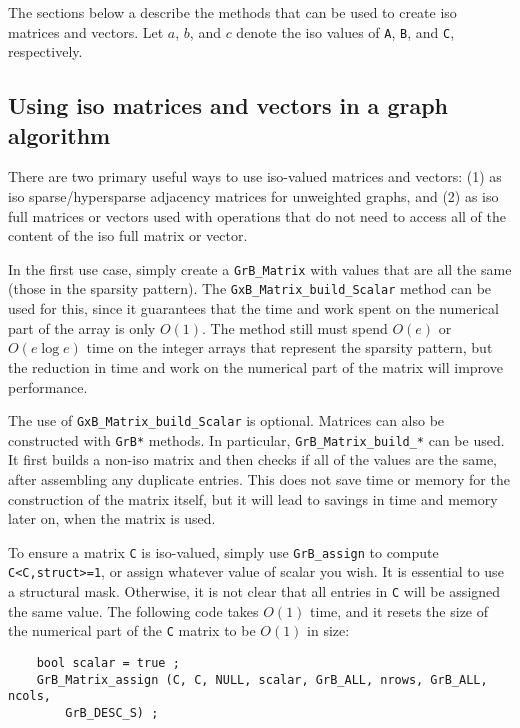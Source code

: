 \documentclass[12pt]{article}
\begin{document}
{The sections below a describe the methods that can be used to create iso
matrices and vectors.  Let $a$, $b$, and $c$ denote the iso values of \verb'A',
\verb'B', and \verb'C', respectively.

\subsection{Using iso matrices and vectors in a graph algorithm}
\label{iso_usage}

There are two primary useful ways to use iso-valued matrices and vectors: (1)
as iso sparse/hypersparse adjacency matrices for unweighted graphs, and (2) as
iso full matrices or vectors used with operations that do not need to access
all of the content of the iso full matrix or vector.

In the first use case, simply create a \verb'GrB_Matrix' with values that are
all the same (those in the sparsity pattern).  The
\verb'GxB_Matrix_build_Scalar' method can be used for this, since it
guarantees that the time and work spent on the numerical part of the array
is only $O(1)$.  The method still must spend $O(e)$ or $O(e \log e)$ time
on the integer arrays that represent the sparsity pattern, but the reduction
in time and work on the numerical part of the matrix will improve performance.

The use of \verb'GxB_Matrix_build_Scalar' is optional.  Matrices can also be
constructed with \verb'GrB*' methods.  In particular, \verb'GrB_Matrix_build_*'
can be used.  It first builds a non-iso matrix and then checks if all of the
values are the same, after assembling any duplicate entries.  This does not
save time or memory for the construction of the matrix itself, but it will
lead to savings in time and memory later on, when the matrix is used.

To ensure a matrix \verb'C' is iso-valued, simply use \verb'GrB_assign' to
compute \verb'C<C,struct>=1', or assign whatever value of scalar you wish.
It is essential to use a structural mask.  Otherwise, it is not clear that
all entries in \verb'C' will be assigned the same value.  The following
code takes $O(1)$ time, and it resets the size of the numerical part of the
\verb'C' matrix to be $O(1)$ in size:

{\footnotesize
\begin{verbatim}
    bool scalar = true ;
    GrB_Matrix_assign (C, C, NULL, scalar, GrB_ALL, nrows, GrB_ALL, ncols,
        GrB_DESC_S) ; \end{verbatim}}

}
\end{document}
